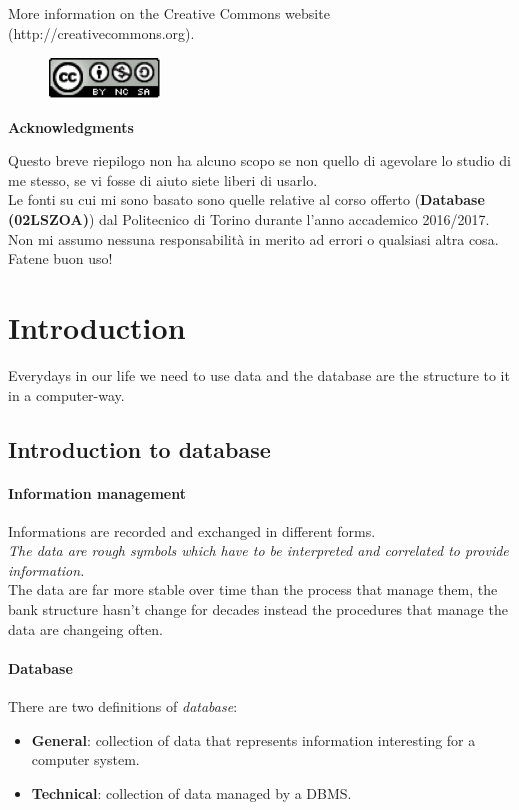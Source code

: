 \documentclass[12pt]{article}
\begin{document}
\noindent More information on the Creative Commons website (http://creativecommons.org).

\begin{figure}[h!]
  \centering
  \includegraphics[width=3cm]{images/license.png}
\end{figure}

{\noindent \Large \textbf{Acknowledgments}\bigskip}

Questo breve riepilogo non ha alcuno scopo se non quello di agevolare lo studio di me stesso, se vi fosse di aiuto siete liberi di usarlo.\\
Le fonti su cui mi sono basato sono quelle relative al corso offerto (\textbf{Database (02LSZOA)}) dal Politecnico di Torino durante l'anno accademico 2016/2017.\\
Non mi assumo nessuna responsabilità in merito ad errori o qualsiasi altra cosa. Fatene buon uso!
\newpage

\section{Introduction}\label{intro}
Everydays in our life we need to use data and the database are the structure to it in a computer-way.
\subsection{Introduction to database}

\paragraph{Information management}
Informations are recorded and exchanged in different forms.\\
\textit{The data are rough symbols which have to be interpreted and correlated to provide information.}\\
The data are far more stable over time than the process that manage them, the bank structure hasn't change for decades instead the procedures that manage the data are changeing often.

\paragraph{Database}
There are two definitions of \textit{database}:
\begin{itemize}
  \item \textbf{General}: collection of data that represents information interesting for a computer system.
  \item \textbf{Technical}: collection of data managed by a DBMS.
\end{itemize}
\end{document}
